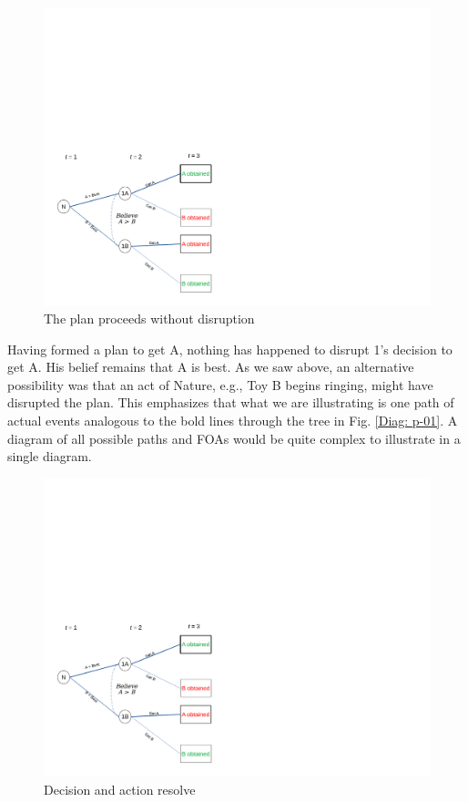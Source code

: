 \documentclass[
11pt,
titlepage,
reqno,
]{article}%
\theoremstyle{definition}
\begin{document}
\begin{figure}[h!]
	\centering
	\includegraphics*[page=5,trim = 0 3in 3in 0in,scale=.85]{Awareness_Diagrams_All}
	\caption{The plan proceeds without disruption\label{Diag: p-05}}%
\end{figure}

Having formed a plan to get A, nothing has happened to disrupt 1's decision to get A. His belief remains that A is best. As we saw above, an alternative possibility was that an act of Nature, e.g., Toy B begins ringing, might have disrupted the plan. This emphasizes that what we are illustrating is one path of actual events analogous to the bold lines through the tree in Fig. \ref{Diag: p-01}. A diagram of all possible paths and FOAs would be quite complex to illustrate in a single diagram. 


\begin{figure}[h!]
	\centering
	\includegraphics*[page=6,trim = 0 2in 3in 0in,scale=.85]{Awareness_Diagrams_All}
	\caption{Decision and action resolve\label{Diag: p-06}}%
\end{figure}
\end{document}
